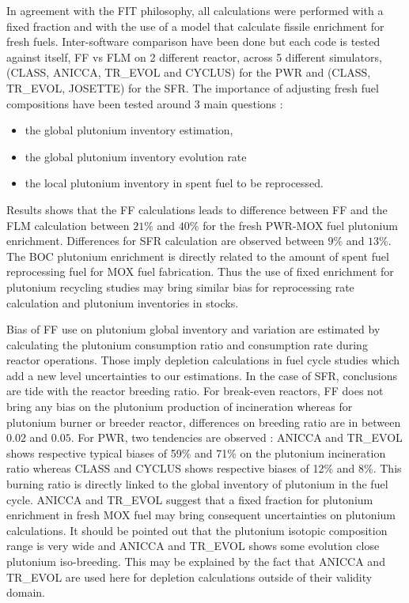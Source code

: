 In agreement with the FIT philosophy, all calculations were performed with a
fixed fraction and with the use of a model that calculate fissile enrichment for
fresh fuels. Inter-software comparison have been done but each code is tested
against itself, \gls{FF} vs \gls{FLM} on 2 different reactor, across 5 different
simulators, (CLASS, ANICCA, TR\_EVOL and CYCLUS) for the \gls{PWR} and (CLASS,
TR\_EVOL, JOSETTE) for the \gls{SFR}. The importance of adjusting fresh fuel
compositions have been tested around 3 main questions : 
\begin{itemize}
    \item the global plutonium inventory estimation,
    \item the global plutonium inventory evolution rate 
    \item the local plutonium inventory in spent fuel to be reprocessed.
\end{itemize}

Results shows that the \gls{FF} calculations leads to difference between
\gls{FF} and the \gls{FLM} calculation between $21\%$ and $40\%$ for the fresh
\gls{PWR}-\gls{MOX} fuel plutonium enrichment. Differences for \gls{SFR}
calculation are observed between $9\%$ and $13\%$.  The \gls{BOC} plutonium
enrichment is directly related to the amount of spent fuel reprocessing fuel for
MOX fuel fabrication. Thus the use of fixed enrichment for plutonium recycling
studies may bring similar bias for reprocessing rate calculation and plutonium
inventories in stocks. 

Bias of \gls{FF} use on plutonium global inventory and variation are estimated
by calculating the plutonium consumption ratio and consumption rate during
reactor operations. Those imply depletion calculations in fuel cycle studies
which add a new level uncertainties to our estimations. In the case of
\gls{SFR}, conclusions are tide with the reactor breeding ratio. For break-even
reactors, \gls{FF} does not bring any bias on the plutonium production of
incineration whereas for plutonium burner or breeder reactor, differences on
breeding ratio are in between $0.02$ and $0.05$. For PWR, two tendencies are
observed : ANICCA and TR\_EVOL shows respective typical biases of 59\% and 71\%
on the plutonium incineration ratio whereas CLASS and CYCLUS shows respective
biases of 12\% and 8\%. This burning ratio is directly linked to the global
inventory of plutonium in the fuel cycle. ANICCA and TR\_EVOL suggest that a
fixed fraction for plutonium enrichment in fresh MOX fuel may bring consequent
uncertainties on plutonium calculations. It should be pointed out that the
plutonium isotopic composition range is very wide and ANICCA and TR\_EVOL shows
some evolution close plutonium iso-breeding. This may be explained by the fact
that ANICCA and TR\_EVOL are used here for depletion calculations outside of
their validity domain.        

